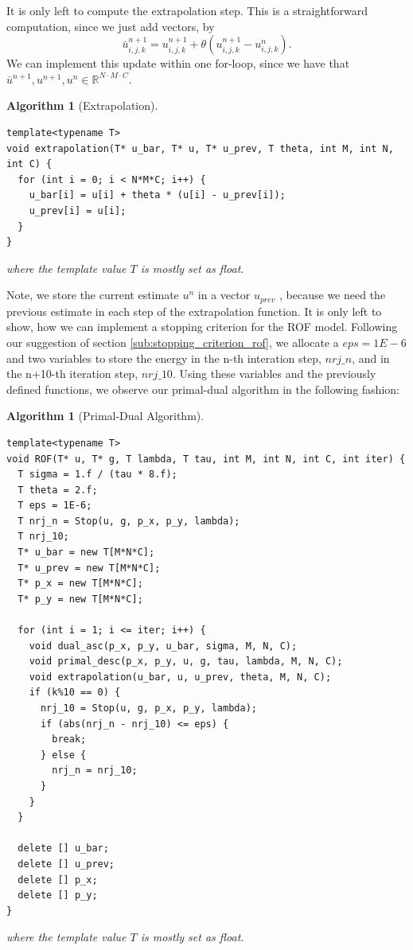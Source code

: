 \documentclass{scrreprt}
\newtheorem{algorithm}[theorem]{Algorithm}
\begin{document}
                It is only left to compute the extrapolation step. This is a straightforward computation, since we just add vectors, by
                    $$
                        \bar{u}^{n+1}_{i,j,k} = u^{n+1}_{i,j,k} + \theta (u^{n+1}_{i,j,k} - u^{n}_{i,j,k}).
                    $$
                We can implement this update within one for-loop, since we have that $\bar{u}^{n+1}, u^{n+1}, u^{n} \in \mathbb{R}^{N \cdot M \cdot C}$.

                    \begin{algorithm}[Extrapolation]
                    \label{alg:extrapolation}
                        \begin{lstlisting}
template<typename T>
void extrapolation(T* u_bar, T* u, T* u_prev, T theta, int M, int N, int C) {
  for (int i = 0; i < N*M*C; i++) {
    u_bar[i] = u[i] + theta * (u[i] - u_prev[i]);
    u_prev[i] = u[i];
  }
}
                        \end{lstlisting}
                        where the template value $T$ is mostly set as float.
                    \end{algorithm}

                Note, we store the current estimate $u^{n}$ in a vector $u_{prev}$ , because we need the previous estimate in each step of the extrapolation function. It is only left to show, how we can implement a stopping criterion for the ROF model. Following our suggestion of section \ref{sub:stopping_criterion_rof}, we allocate a $eps = 1E-6$ and two variables to store the energy in the n-th interation step, $nrj\_n$, and in the n+10-th iteration step, $nrj\_10$. Using these variables and the previously defined functions, we observe our primal-dual algorithm in the following fashion:

                    \begin{algorithm}[Primal-Dual Algorithm]
                    \label{alg:primal_dual}
                        \begin{lstlisting}
template<typename T>
void ROF(T* u, T* g, T lambda, T tau, int M, int N, int C, int iter) {
  T sigma = 1.f / (tau * 8.f);
  T theta = 2.f;
  T eps = 1E-6;
  T nrj_n = Stop(u, g, p_x, p_y, lambda);
  T nrj_10;
  T* u_bar = new T[M*N*C];
  T* u_prev = new T[M*N*C];
  T* p_x = new T[M*N*C];
  T* p_y = new T[M*N*C];
  
  for (int i = 1; i <= iter; i++) {
    void dual_asc(p_x, p_y, u_bar, sigma, M, N, C);
    void primal_desc(p_x, p_y, u, g, tau, lambda, M, N, C);
    void extrapolation(u_bar, u, u_prev, theta, M, N, C);
    if (k%10 == 0) {
      nrj_10 = Stop(u, g, p_x, p_y, lambda);
      if (abs(nrj_n - nrj_10) <= eps) {
        break;
      } else {
        nrj_n = nrj_10;
      }
    }
  }

  delete [] u_bar;
  delete [] u_prev;
  delete [] p_x;
  delete [] p_y;
}
                        \end{lstlisting}
                        where the template value $T$ is mostly set as float.
                    \end{algorithm}
\end{document}
